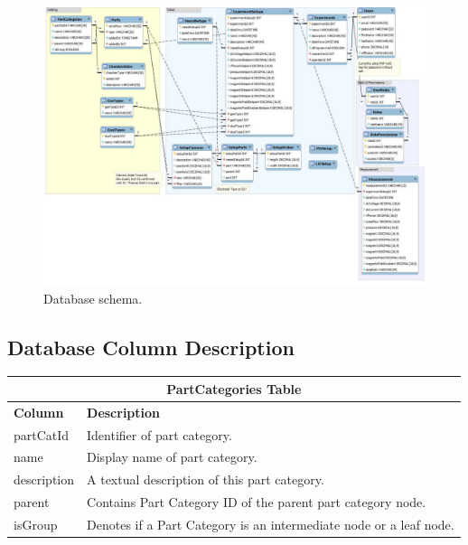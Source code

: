 \begin{figure}[h]
\centering
\includegraphics[width=6in]{schema.pdf}
\caption{Database schema.\label{fig:schema}}
\end{figure}



\subsection{Database Column Description}

\begin{table}[h!]
\centering
\begin{tabular}{l p{12cm}}
\multicolumn{2}{c}{\bf PartCategories Table} \\ \hline
{\bf Column} & {\bf Description}\\ \hline
partCatId & Identifier of part category.\\ \hline
name & Display name of part category.\\ \hline
description & A textual description of this part category. \\ \hline
parent & Contains Part Category ID of the parent part category node.\\ \hline
isGroup & Denotes if a Part Category is an intermediate node or a leaf node. \\ \hline
\end{tabular}
\end{table}

